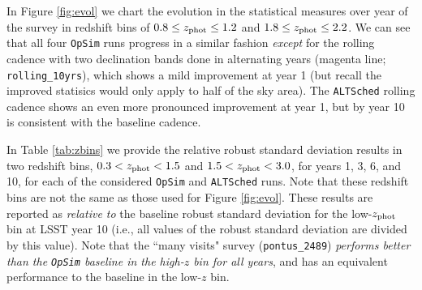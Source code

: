 In Figure \ref{fig:evol} we chart the evolution in the statistical measures over year of the survey in redshift bins of $0.8 \leq z_{\rm phot} \leq 1.2$  and $1.8 \leq z_{\rm phot} \leq 2.2$. We can see that all four {\tt OpSim} runs progress in a similar fashion {\it except} for the rolling cadence with two declination bands done in alternating years (magenta line; {\tt rolling\_10yrs}), which shows a mild improvement at year 1 (but recall the improved statisics would only apply to half of the sky area). The {\tt ALTSched} rolling cadence shows an even more pronounced improvement at year 1, but by year 10 is consistent with the baseline cadence.

In Table \ref{tab:zbins} we provide the relative robust standard deviation results in two redshift bins, $0.3<z_{\rm phot}<1.5$ and $1.5<z_{\rm phot}<3.0$, for years 1, 3, 6, and 10, for each of the considered {\tt OpSim} and {\tt ALTSched} runs. Note that these redshift bins are not the same as those used for Figure \ref{fig:evol}. These results are reported as {\it relative to} the baseline robust standard deviation for the low-$z_{\rm phot}$ bin at LSST year 10 (i.e., all values of the robust standard deviation are divided by this value). Note that the ``many visits" survey ({\tt pontus\_2489}) {\it performs better than the {\tt OpSim} baseline in the high-$z$ bin for all years}, and has an equivalent performance to the baseline in the low-$z$ bin.

